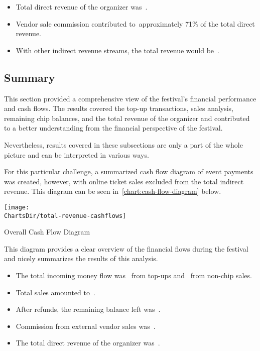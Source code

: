 \begin{keytakeaways}
	\begin{itemize}
		\item Total direct revenue of the organizer was~.
		\item Vendor sale commission contributed to~approximately 71\% of the total direct revenue.
		\item With other indirect revenue streams, the total revenue would be~.
	\end{itemize}
\end{keytakeaways}

\pagebreak[4]


\subsection{Summary}
\label{subsec:analysis-cashflow-summary}

This section provided a comprehensive view of the festival's financial performance and cash flows.
The results covered the top-up transactions, sales analysis, remaining chip balances, and the total revenue of the organizer and contributed to a better understanding from the financial perspective of the festival.

Nevertheless, results covered in these subsections are only a part of the whole picture and can be interpreted in various ways.

For this particular challenge, a summarized cash flow diagram of event payments was created, however, with online ticket sales excluded from the total indirect revenue.
This diagram can be seen in~\autoref{chart:cash-flow-diagram} below.

\begin{chart}[h]
	\centering
	\texttt{[image: \\ChartsDir/total-revenue-cashflows]}
	\caption{Overall Cash Flow Diagram}
	\label{chart:cash-flow-diagram}
	\source
\end{chart}

This diagram provides a clear overview of the financial flows during the festival and nicely summarizes the results of this analysis.

\begin{keytakeaways}
	\begin{itemize}
		\item The total incoming money flow was~ from top-ups and~ from non-chip sales.
		\item Total sales amounted to~.
		\item After refunds, the remaining balance left was~.
		\item Commission from external vendor sales was~.
		\item The total direct revenue of the organizer was~.
	\end{itemize}
\end{keytakeaways}

